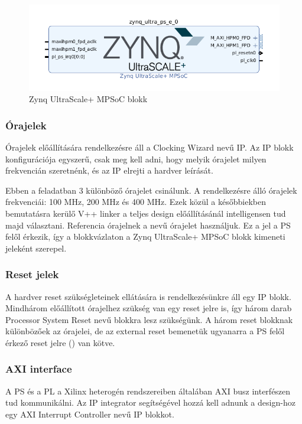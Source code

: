 \begin{figure}[!ht]
    \centering
    \includegraphics[width=150mm, keepaspectratio]{figures/block_automation_result.png}
    \caption{Zynq UltraScale+ MPSoC blokk}
\end{figure}

\subsubsection{Órajelek}
Órajelek előállítására rendelkezésre áll a Clocking Wizard nevű IP. Az IP blokk konfigurációja egyszerű, csak meg kell adni, hogy melyik órajelet milyen frekvencián szeretnénk, és az IP elrejti a hardver leírását.

Ebben a feladatban 3 különböző órajelet csinálunk. A rendelkezésre álló órajelek frekvenciái: 100 MHz, 200 MHz és 400 MHz. Ezek közül a későbbiekben bemutatásra kerülő V++ linker a teljes design előállításánál intelligensen tud majd választani. Referencia órajelnek a  nevű órajelet használjuk. Ez a jel a PS felől érkezik, így a blokkvázlaton a Zynq UltraScale+ MPSoC blokk kimeneti jeleként szerepel.

\subsubsection{Reset jelek}
A hardver reset szükségleteinek ellátására is rendelkezésünkre áll egy IP blokk. Mindhárom előállított órajelhez szükség van egy reset jelre is, így három darab Processor System Reset nevű blokkra lesz szükségünk. A három reset blokknak különbözőek az órajelei, de az external reset bemenetük ugyanarra a PS felől érkező reset jelre () van kötve.

\subsubsection{AXI interface}
A PS és a PL a Xilinx heterogén rendszereiben általában AXI busz interfészen tud kommunikálni. Az IP integrator segítségével hozzá kell adnunk a design-hoz egy AXI Interrupt Controller nevű IP blokkot. 

